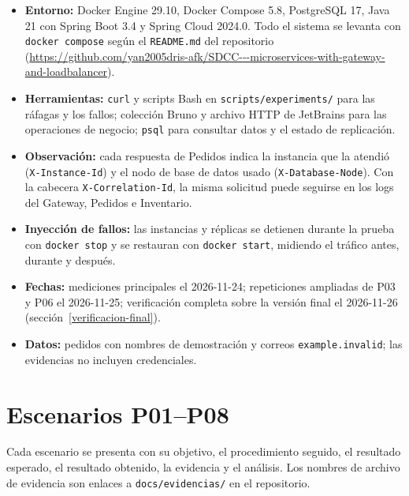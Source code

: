 \documentclass[
  spanish,
  a4paper,
  11pt
]{article}
\providecommand{\tightlist}{\setlength{\itemsep}{0pt}\setlength{\parskip}{0pt}}
\begin{document}
\begin{itemize}
\tightlist
\item \textbf{Entorno:} Docker Engine 29.10, Docker Compose 5.8, PostgreSQL 17,
  Java 21 con Spring Boot 3.4 y Spring Cloud 2024.0. Todo el sistema se levanta
  con \texttt{docker compose} según el \texttt{README.md} del repositorio
  (\url{https://github.com/yan2005dris-afk/SDCC---microservices-with-gateway-and-loadbalancer}).
\item \textbf{Herramientas:} \texttt{curl} y scripts Bash en
  \texttt{scripts/experiments/} para las ráfagas y los fallos; colección Bruno y
  archivo HTTP de JetBrains para las operaciones de negocio; \texttt{psql} para
  consultar datos y el estado de replicación.
\item \textbf{Observación:} cada respuesta de Pedidos indica la instancia que
  la atendió (\texttt{X-Instance-Id}) y el nodo de base de datos usado
  (\texttt{X-Database-Node}). Con la cabecera \texttt{X-Correlation-Id}, la
  misma solicitud puede seguirse en los logs del Gateway, Pedidos e
  Inventario.
\item \textbf{Inyección de fallos:} las instancias y réplicas se detienen
  durante la prueba con \texttt{docker stop} y se restauran con
  \texttt{docker start}, midiendo el tráfico antes, durante y después.
\item \textbf{Fechas:} mediciones principales el 2026-11-24; repeticiones
  ampliadas de P03 y P06 el 2026-11-25; verificación completa sobre la versión
  final el 2026-11-26 (sección~\ref{verificacion-final}).
\item \textbf{Datos:} pedidos con nombres de demostración y correos
  \texttt{example.invalid}; las evidencias no incluyen credenciales.
\end{itemize}

\section{Escenarios P01--P08}\label{escenarios-detalle}

Cada escenario se presenta con su objetivo, el procedimiento seguido, el
resultado esperado, el resultado obtenido, la evidencia y el análisis. Los
nombres de archivo de evidencia son enlaces a \texttt{docs/evidencias/} en el
repositorio.
\end{document}
